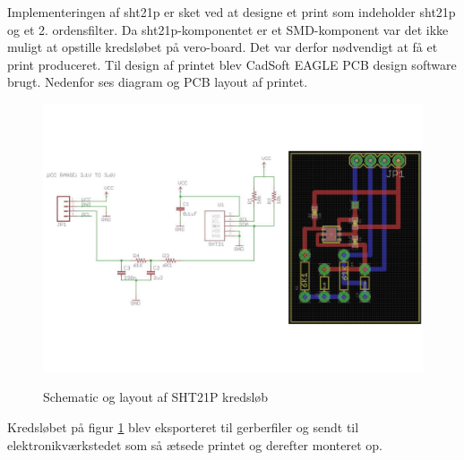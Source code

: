 Implementeringen af sht21p er sket ved at designe et print som indeholder sht21p og et 2. ordensfilter. 
Da sht21p-komponentet er et SMD-komponent var det ikke muligt at opstille kredsløbet på vero-board. Det var derfor nødvendigt at få et print produceret. Til design af printet blev CadSoft EAGLE PCB design software brugt. Nedenfor ses diagram og PCB layout af printet.


\begin{figure}[htb]
\centering
{\includegraphics[width=\textwidth]{filer/implementering/SHT_pcb}}
\caption{Schematic og layout af SHT21P kredsl\o{}b}
\label{lab:SHT21P-kredsloeb}
\end{figure}

Kredsløbet på figur \ref{lab:SHT21P-kredsloeb} blev eksporteret til gerberfiler og sendt til elektronikværkstedet som så ætsede printet og derefter monteret op.

